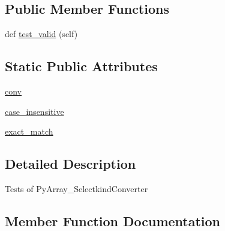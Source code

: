 \subsection*{Public Member Functions}
\begin{DoxyCompactItemize}
\item 
def \hyperlink{classnumpy_1_1core_1_1tests_1_1test__conversion__utils_1_1TestSelectkindConverter_a3c393025530530ed932e9da45732b3d0}{test\+\_\+valid} (self)
\end{DoxyCompactItemize}
\subsection*{Static Public Attributes}
\begin{DoxyCompactItemize}
\item 
\hyperlink{classnumpy_1_1core_1_1tests_1_1test__conversion__utils_1_1TestSelectkindConverter_ab9028de6e607d21a5b28caf8121fef5d}{conv}
\item 
\hyperlink{classnumpy_1_1core_1_1tests_1_1test__conversion__utils_1_1TestSelectkindConverter_a13b23e287963954f0454700475694c60}{case\+\_\+insensitive}
\item 
\hyperlink{classnumpy_1_1core_1_1tests_1_1test__conversion__utils_1_1TestSelectkindConverter_a2a37e3eb13dbfdaedba56c2fc9afcb38}{exact\+\_\+match}
\end{DoxyCompactItemize}


\subsection{Detailed Description}
\begin{DoxyVerb}Tests of PyArray_SelectkindConverter \end{DoxyVerb}
 

\subsection{Member Function Documentation}
\mbox{\label{classnumpy_1_1core_1_1tests_1_1test__conversion__utils_1_1TestSelectkindConverter_a3c393025530530ed932e9da45732b3d0}} 

